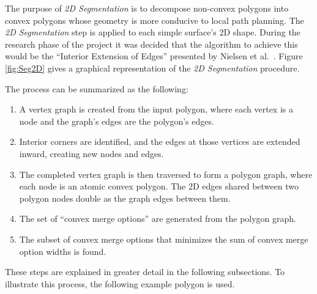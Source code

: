 The purpose of \textit{2D Segmentation} is to decompose non-convex polygons into convex polygons whose geometry is more conducive to local path planning.
The \textit{2D Segmentation} step is applied to each simple surface's 2D shape.
During the research phase of the project it was decided that the algorithm to achieve this would be the ``Interior Extension of Edges'' presented by Nielsen et al.~\cite{IntEdgeExt}.
Figure \ref{fig:Seg2D} gives a graphical representation of the \textit{2D Segmentation} procedure.

The process can be summarized as the following:
\begin{enumerate}
	\item A vertex graph is created from the input polygon, where each vertex is a node and the graph's edges are the polygon's edges.
	\item Interior corners are identified, and the edges at those vertices are extended inward, creating new nodes and edges.
	\item The completed vertex graph is then traversed to form a polygon graph, where each node is an atomic convex polygon.
		The 2D edges shared between two polygon nodes double as the graph edges between them.
	\item The set of ``convex merge options'' are generated from the polygon graph.
	\item The subset of convex merge options that minimizes the sum of convex merge option widths is found.
\end{enumerate}
These steps are explained in greater detail in the following subsections.
To illustrate this process, the following example polygon is used.

